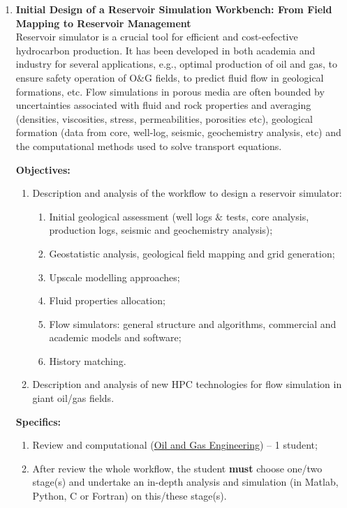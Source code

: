 \documentclass[12pts,a4paper,amsmath,amssymb,floatfix]{article}%
\begin{document}

\begin{enumerate}[label=\bfseries Project:]%

\item {\bf Initial Design of a Reservoir Simulation Workbench: From Field Mapping to Reservoir Management}\\
Reservoir simulator is a crucial tool for efficient and cost-eefective hydrocarbon production. It has been developed in both academia and industry for several applications, e.g., optimal production of oil and gas, to ensure safety operation of O$\&$G fields, to predict fluid flow in geological formations, etc. Flow simulations in porous media are often bounded by uncertainties associated with fluid and rock properties and averaging (densities, viscosities, stress, permeabilities, porosities etc), geological formation (data from core, well-log, seismic, geochemistry analysis, etc) and the computational methods used to solve transport equations. 

\noindent
{\bf Objectives:}
\begin{enumerate}
\item Description and analysis of the workflow to design a reservoir simulator:
\begin{enumerate}
\item Initial geological assessment (well logs $\&$ tests, core analysis, production logs, seismic and geochemistry analysis);
\item Geostatistic analysis, geological field mapping and grid generation;
\item Upscale modelling approaches;
\item Fluid properties allocation;
\item Flow simulators: general structure and algorithms, commercial and academic models and software;
\item History matching.
\end{enumerate}
\item Description and analysis of new HPC technologies for flow simulation in giant oil/gas fields.
\end{enumerate}

\noindent
{\bf Specifics:} 
\begin{enumerate}
\item Review and computational (\underline{Oil and Gas Engineering}) -- 1 student;
\item After review the whole workflow, the student {\bf must} choose one/two stage(s) and undertake an in-depth analysis and simulation (in Matlab, Python, C or Fortran) on this/these stage(s).
\end{enumerate}


\end{enumerate}
\end{document}

